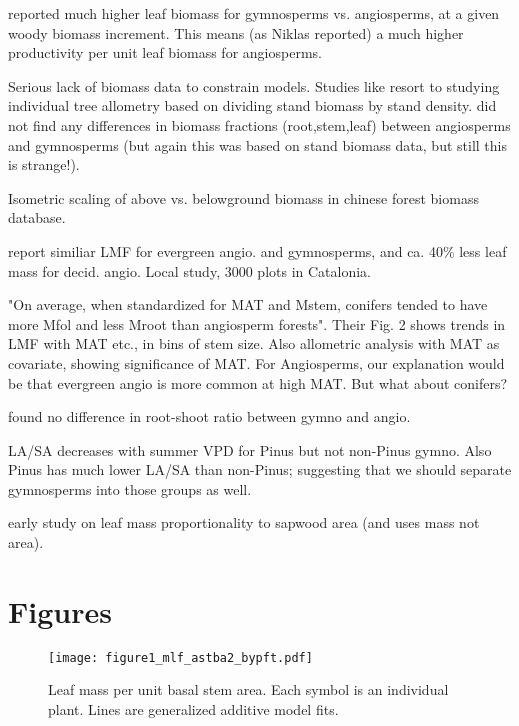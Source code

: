 \documentclass[a4paper]{article}
\begin{document}
\cite{oneill_comparative_1981} reported much higher leaf biomass for gymnosperms vs. angiosperms, at a given woody biomass increment. This means (as Niklas reported) a much higher productivity per unit leaf biomass for angiosperms.

Serious lack of biomass data to constrain models. Studies like \cite{wolf_forest_2011} resort to studying individual tree allometry based on dividing stand biomass by stand density. \cite{wolf_allometric_2010} did not find any differences in biomass fractions (root,stem,leaf) between angiosperms and gymnosperms (but again this was based on stand biomass data, but still this is strange!).

\cite{hui_near_2014} Isometric scaling of above vs. belowground biomass in chinese forest biomass database.

\cite{sardans_tree_2013} report similiar LMF for evergreen angio. and gymnosperms, and ca. 40\% less leaf mass for decid. angio. Local study, 3000 plots in Catalonia.

\cite{reich_temperature_2014} "On average, when standardized for MAT and Mstem, conifers tended to have more Mfol and less Mroot than angiosperm forests". Their Fig. 2 shows trends in LMF with MAT etc., in bins of stem size. Also allometric analysis with MAT as covariate, showing significance of MAT. For Angiosperms, our explanation would be that evergreen angio is more common at high MAT. But what about conifers?

\cite{cairns_root_1997} found no difference in root-shoot ratio between gymno and angio.

\cite{delucia_climate-driven_2000} LA/SA decreases with summer VPD for Pinus but not non-Pinus gymno. Also Pinus has much lower LA/SA than non-Pinus; suggesting that we should separate gymnosperms into those groups as well.


\cite{grier_notes:_1974} early study on leaf mass proportionality to sapwood area (and uses mass not area).








\section{Figures}


\begin{figure}[h!]
    \centering
    \texttt{[image: figure1\_mlf\_astba2\_bypft.pdf]}
    \caption{Leaf mass per unit basal stem area. Each symbol is an individual plant. Lines are generalized additive model fits.}
    \label{fig:figure1}
\end{figure}
\end{document}
